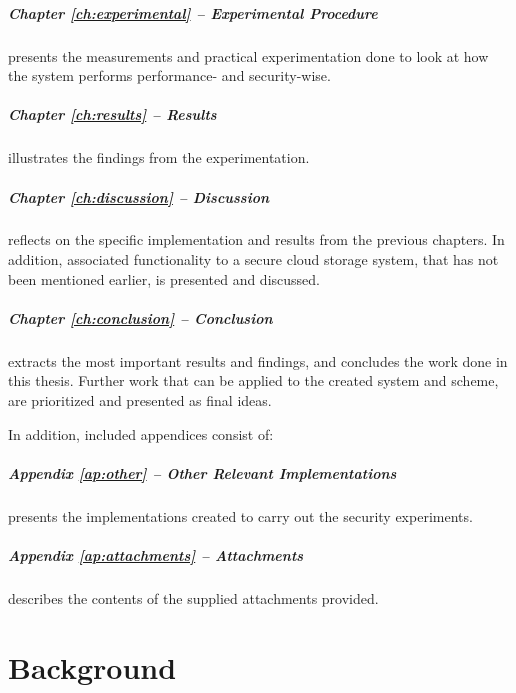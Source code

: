 \documentclass[pdftex,english,10pt,b5paper,twoside]{book}
\begin{document}
\paragraph{Chapter \ref{ch:experimental} -- Experimental Procedure} presents
the measurements and practical experimentation done to look at how the system
performs performance- and security-wise.

\paragraph{Chapter \ref{ch:results} -- Results} illustrates the findings from
the experimentation.

\paragraph{Chapter \ref{ch:discussion} -- Discussion} reflects on the specific
implementation and results from the previous chapters. In addition, associated
functionality to a secure cloud storage system, that has not been mentioned
earlier, is presented and discussed.

\paragraph{Chapter \ref{ch:conclusion} -- Conclusion} extracts the most
important results and findings, and concludes the work done in this thesis.
Further work that can be applied to the created system and scheme,
are prioritized and presented as final ideas.

\bigskip

\noindent In addition, included appendices consist of:

\paragraph{Appendix \ref{ap:other} -- Other Relevant Implementations}
presents the implementations created to carry out the security experiments.

\paragraph{Appendix \ref{ap:attachments} -- Attachments} describes the contents
of the supplied attachments provided.

\chapter{Background}
\label{ch:background}
\end{document}

